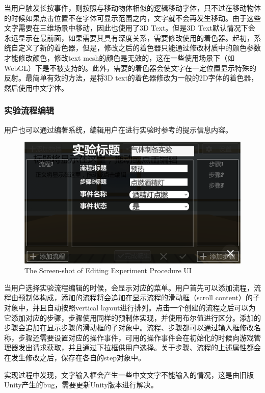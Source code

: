 当用户触发长按事件，则按照与移动物体相似的逻辑移动字体，只不过在移动物体的时候如果点击位置不在字体可显示范围之内，文字就不会再发生移动。由于这些文字需要在三维场景中移动，因此也使用了3D Text。但是3D Text默认情况下会永远显示在最前面，如果需要其具有深度关系，需要修改使用的着色器。起初，系统自定义了新的着色器，但是，修改之后的着色器只能通过修改材质中的颜色参数才能修改颜色，修改text mesh的颜色是无效的，这在一些使用场景下（如WebGL）下是不被支持的。此外，需要的着色器会使文字在一定位置显示特殊的反射。最简单有效的方法，是将3D text的着色器修改为一般的2D字体的着色器，然后使用中文字体。

\subsubsection{实验流程编辑}
用户也可以通过编著系统，编辑用户在进行实验时参考的提示信息内容。

\begin{figure}[!htp]
  \centering
  \includegraphics[width=12cm]{figure/step.png}
    {The Screen-shot of Editing Experiment Procedure UI}
 \label{fig:gm}
\end{figure}

当用户选择实验流程编辑的时候，会显示对应的菜单。用户首先可以添加流程，流程由预制体构成，添加的流程将会追加在显示流程的滑动框（scroll content）的子对象中，并且自动按照vertical layout进行排列。点击一个创建的流程之后可以为它添加对应的步骤，步骤使用同样的预制体实现，并使用布尔值进行区分。添加的步骤会追加在显示步骤的滑动框的子对象中。流程、步骤都可以通过输入框修改名称，步骤还需要设置对应的操作事件，可用的操作事件会在初始化的时候向游戏管理器发出请求获取，并且通过下拉框供用户选择。关于步骤、流程的上述属性都会在发生修改之后，保存在各自的step对象中。

实现过程中发现，文字输入框会产生一些中文文字不能输入的情况，这是由旧版Unity产生的bug，需要更新Unity版本进行解决。

